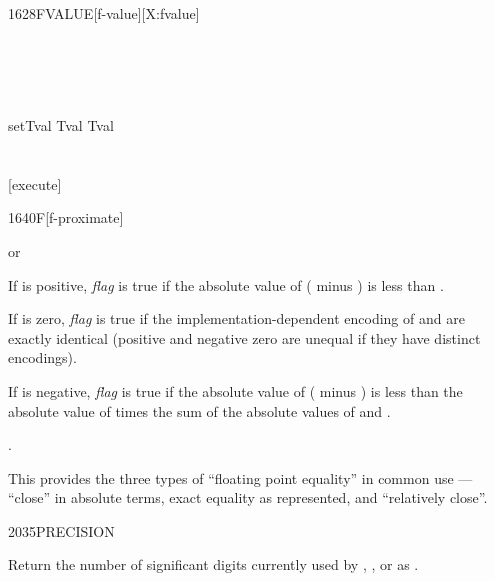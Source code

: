 \begin{worddef}{1628}{FVALUE}[f-value][X:fvalue]
	\begin{testing}\ttfamily
		 \\
		 \\
		 \\
		 \\[2ex]
		\word{:} setTval Tval   Tval \word{;} \\
		 \\[2ex]
		 \\
		\word{:} [execute]  \word{;}  \\
		\test[R]{\word{'} Tval \word{]} [execute] \word{[}}{2e0}
	\end{testing}
\end{worddef}


\begin{worddef}[Ftilde]{1640}{F\tilde}[f-proximate]
\item {}  or

	If  is positive, \emph{flag} is true if the absolute
	value of ( minus ) is less than .

	If  is zero, \emph{flag} is true if the
	implementation-dependent encoding of  and 
	are exactly identical (positive and negative zero are unequal if
	they have distinct encodings).

	If  is negative, \emph{flag} is true if the absolute value
	of ( minus ) is less than the absolute value of
	 times the sum of the absolute values of  and
	.

\see {}.

	\begin{rationale} %
		This provides the three types of ``floating point equality''
		in common use --- ``close'' in absolute terms, exact equality
		as represented, and ``relatively close''.
	\end{rationale}
\end{worddef}


\begin{worddef}{2035}{PRECISION}
\item {}

	Return the number of significant digits currently used by
	, , or  as .
\end{worddef}


